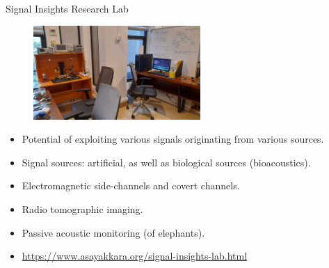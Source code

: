 \documentclass[handout]{beamer}
\begin{document}
\begin{frame}{Signal Insights Research Lab}  

	\begin{figure}
		\includegraphics[width=180pt]{figures/signal-insights-lab-view.jpg}
	\end{figure}
	
	\begin{itemize}
		\footnotesize
		\item Potential of exploiting various signals originating from various sources.  
		\item Signal sources: artificial, as well as biological sources (bioacoustics).
		\item Electromagnetic side-channels and covert channels.
		\item Radio tomographic imaging.
		\item Passive acoustic monitoring (of elephants).
		\item {\scriptsize \url{https://www.asayakkara.org/signal-insights-lab.html}}
	\end{itemize}

\end{frame}
\end{document}
